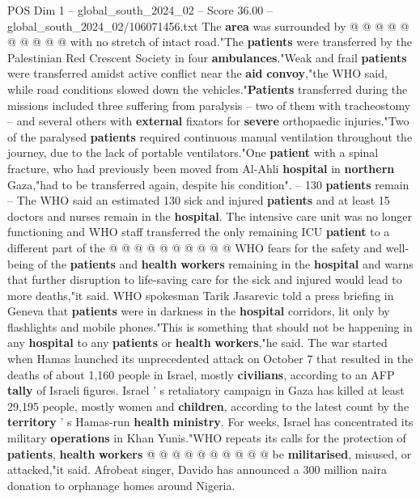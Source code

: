 \begin{textsample}{POS Dim 1 – global\_south\_2024\_02 – Score 36.00 – global\_south\_2024\_02/106071456.txt}
The \textbf{area} was surrounded by @ @ @ @ @ @ @ @ @ @ with no stretch of intact road."The \textbf{patients} were transferred by the Palestinian Red Crescent Society in four \textbf{ambulances}."Weak and frail \textbf{patients} were transferred amidst active conflict near the \textbf{aid} \textbf{convoy},"the WHO said, while road conditions slowed down the vehicles."\textbf{Patients} transferred during the missions included three suffering from paralysis -- two of them with tracheostomy -- and several others with \textbf{external} fixators for \textbf{severe} orthopaedic injuries."Two of the paralysed \textbf{patients} required continuous manual ventilation throughout the journey, due to the lack of portable ventilators."One \textbf{patient} with a spinal fracture, who had previously been moved from Al-Ahli \textbf{hospital} in \textbf{northern} Gaza,"had to be transferred again, despite his condition". -- 130 \textbf{patients} remain -- The WHO said an estimated 130 sick and injured \textbf{patients} and at least 15 doctors and nurses remain in the \textbf{hospital}.
The intensive care unit was no longer functioning and WHO staff transferred the only remaining ICU \textbf{patient} to a different part of the @ @ @ @ @ @ @ @ @ @ WHO fears for the safety and well-being of the \textbf{patients} and \textbf{health} \textbf{workers} remaining in the \textbf{hospital} and warns that further disruption to life-saving care for the sick and injured would lead to more deaths,"it said.
WHO spokesman Tarik Jasarevic told a press briefing in Geneva that \textbf{patients} were in darkness in the \textbf{hospital} corridors, lit only by flashlights and mobile phones."This is something that should not be happening in any \textbf{hospital} to any \textbf{patients} or \textbf{health} \textbf{workers},"he said.
The war started when Hamas launched its unprecedented attack on October 7 that resulted in the deaths of about 1,160 people in Israel, mostly \textbf{civilians}, according to an AFP \textbf{tally} of Israeli figures.
Israel ' s retaliatory campaign in Gaza has killed at least 29,195 people, mostly women and \textbf{children}, according to the latest count by the \textbf{territory} ' s Hamas-run \textbf{health} \textbf{ministry}.
For weeks, Israel has concentrated its military \textbf{operations} in Khan Yunis."WHO repeats its calls for the protection of \textbf{patients}, \textbf{health} \textbf{workers} @ @ @ @ @ @ @ @ @ @ be \textbf{militarised}, misused, or attacked,"it said.
Afrobeat singer, Davido has announced a 300 million naira donation to orphanage homes around Nigeria.

\end{textsample}
